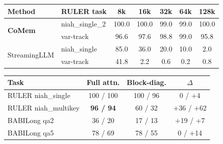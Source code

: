 \begin{table}[!htbp]
\centering
\small
\begin{minipage}[t]{\textwidth}
\centering
\setlength{\tabcolsep}{4.5pt}
\begin{tabular}{@{}llccccc@{}}
\toprule
\textbf{Method} & \textbf{RULER task} & \textbf{8k} & \textbf{16k} & \textbf{32k} & \textbf{64k} & \textbf{128k} \\
\midrule
\multirow{2}{*}{\textbf{CoMem}} & niah\_single\_2 & 100.0 & 100.0 & 99.0 & 99.0 & 100.0 \\
& var-track & 96.6 & 97.6 & 98.8 & 99.0 & 95.8 \\
\midrule
\multirow{2}{*}{StreamingLLM} & niah\_single & 85.0 & 36.0 & 20.0 & 10.0 & 2.0 \\
& var-track & 41.8 & 2.2 & 0.6 & 0.2 & 0.8 \\
\bottomrule
\end{tabular}
\label{tab:slm}
\end{minipage}

\vspace{6pt}
\begin{minipage}[t]{\textwidth}
\centering
\setlength{\tabcolsep}{6pt}
\begin{tabular}{@{}lccc@{}}
\toprule
\textbf{Task} & \textbf{Full attn.} & \textbf{Block-diag.} & \boldmath$\Delta$ \\
\midrule
RULER niah\_single   & 100 / 100 & 100 / 96 & 0 / $+$4 \\
RULER niah\_multikey & \textbf{96 / 94} & 60 / 32 & $+$36 / $+$62 \\
BABILong qa2         & 36 / 20 & 17 / 13 & $+$19 / $+$7 \\
BABILong qa5         & 78 / 69 & 78 / 55 & 0 / $+$14 \\
\bottomrule
\end{tabular}
\label{tab:crosschunk}
\end{minipage}


\end{table}
